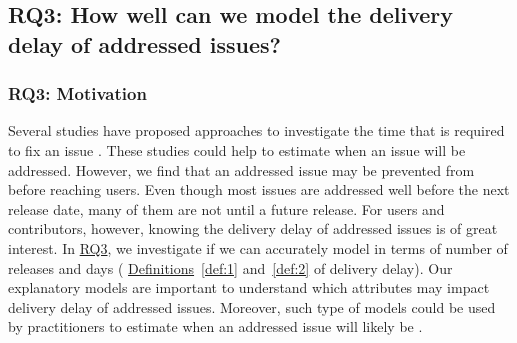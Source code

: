 \subsection{RQ3: How well can we model the delivery delay of
addressed issues?}\label{ch4:rq3}

\subsubsection*{RQ3: Motivation} 

Several studies have proposed approaches to investigate the time that is
required to fix an issue \cite{Anbalagan2009,Giger2010, Kim2006, Marks2011,
Weib2007, Zhang2013}. These studies could help to estimate when an issue will be
addressed. However, we find that an addressed issue may be prevented from
\DIFdelbegin {}\DIFdelend \DIFaddbegin {}\DIFaddend before reaching users. Even though most issues are addressed well before the next
release date, many of them are not \DIFdelbegin {}\DIFdelend \DIFaddbegin {}\DIFaddend until a future release. For users
and contributors, however, knowing the delivery delay of addressed issues is of
great interest. In \hyperref[ch4:rq3]{RQ3}, we investigate if we can accurately
model \DIFdelbegin {}\DIFdelend \DIFaddbegin {}\DIFaddend in terms of number of releases and days (\ie
\hyperref[def:1]{Definitions}~\ref{def:1} and~\ref{def:2} of delivery delay).
Our explanatory models are important to understand which attributes may impact
delivery delay of addressed issues. Moreover, such type of models could be used by
practitioners to estimate when an addressed issue will likely be \DIFdelbegin {}\DIFdelend \DIFaddbegin {}\DIFaddend .

